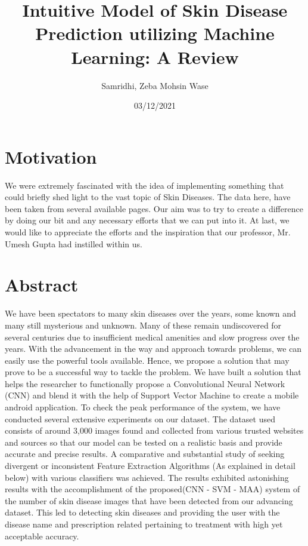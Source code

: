 \documentclass{article}
\title{Intuitive Model of Skin Disease Prediction utilizing Machine Learning: A Review
}
\author{Samridhi, Zeba Mohsin Wase}
\date{03/12/2021}
\begin{document}
\maketitle

\section{Motivation}

We were extremely fascinated with the idea of implementing something that could briefly shed light to the vast topic of Skin Diseases. The data here, have been taken from several available pages. Our aim was to try to create a difference by doing our bit and any necessary efforts that we can put into it. At last, we would like to appreciate the efforts and the inspiration that our professor, Mr. Umesh Gupta had instilled within us.
\section{Abstract}

We have been spectators to many skin diseases over the years, some known and many still mysterious and unknown. Many of these remain undiscovered for several centuries due to insufficient medical amenities and slow progress over the years.
With the advancement in the way and approach towards problems, we can easily use the powerful tools available. Hence, we propose a solution that may prove to be a successful way to tackle the problem.
We have built a solution that helps the researcher to functionally propose a Convolutional Neural Network (CNN) and blend it with the help of Support Vector Machine to create a mobile android application. To check the peak performance of the system, we have conducted several extensive experiments on our dataset. The dataset used consists of around 3,000 images found and collected from various trusted websites and sources so that our model can be tested on a realistic basis and provide accurate and precise results.
A comparative and substantial study of seeking divergent or inconsistent Feature Extraction Algorithms (As explained in detail below) with various classifiers was achieved.
The results exhibited astonishing results with the accomplishment of the proposed(CNN - SVM - MAA) system of the number of skin disease images that have been detected from our advancing dataset. This led to detecting skin diseases and providing the user with the disease name and prescription related pertaining to treatment with high yet acceptable accuracy.
\end{document}
